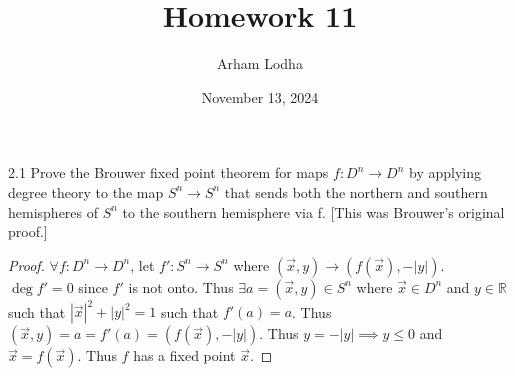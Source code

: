 \documentclass{article}
\newcommand{\R}{\mathbb{R}}
\newcommand{\abs}[1]{\left\lvert #1\right\rvert}
\begin{document}
\title{Homework 11}
\author{Arham Lodha}%
\date{November 13, 2024}%
\maketitle

\begin{PROB}{2.1}\label{Problem 2.1.}
    Prove the Brouwer fixed point theorem for maps $f: D^n \to D^n$ by applying degree theory to the map $S^n \to S^n$ that sends both the northern and southern hemispheres of $S^n$  to the southern hemisphere via f. [This was Brouwer’s original proof.]
\end{PROB}
\begin{proof}
    $\forall f: D^n \to D^n$, let $f': S^n \to S^n$ where $(\vec{x}, y) \to (f(\vec{x}), -\abs{y})$. $\deg f' = 0$ since $f'$ is not onto. Thus $\exists a = (\vec{x}, y) \in S^n$ where $\vec{x} \in D^n$ and $y \in \R$ such that $\abs{\vec{x}}^2 + \abs{y}^2 = 1$ such that $f'(a) = a$. Thus $(\vec{x}, y) = a = f'(a) = (f(\vec{x}), -\abs{y})$. Thus $y = -\abs{y} \implies y \leq 0$ and $\vec{x} = f(\vec{x})$. Thus $f$ has a fixed point $\vec{x}$.  
\end{proof}

\bigskip
\end{document}
